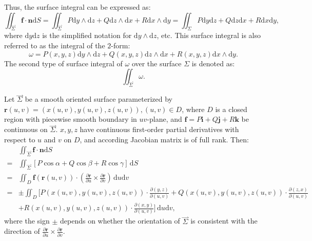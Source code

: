 \documentclass[11pt]{../../TexTemplate/elegantbook}
\begin{document}
Thus, the surface integral can be expressed as:
\[
\iint_{\overset{\rightharpoonup}{\Sigma}} \mathbf{f} \cdot \mathbf{n} \mathrm{d}S = 
\iint_{\overset{\rightharpoonup}{\Sigma}} P \mathrm{d}y \wedge \mathrm{d}z + Q \mathrm{d}z \wedge \mathrm{d}x + R \mathrm{d}x \wedge \mathrm{d}y
= \iint_{\Sigma} P \mathrm{d}y\mathrm{d}z + Q \mathrm{d}z\mathrm{d}x + R \mathrm{d}x\mathrm{d}y,
\]
where \(\mathrm{d}y\mathrm{d}z\) is the simplified notation for \(\mathrm{d}y \wedge \mathrm{d}z\), etc.
This surface integral is also referred to as the integral of the \(2\)-form:
\[
\omega = P(x, y, z) \mathrm{d}y \wedge \mathrm{d}z + Q(x, y, z) \mathrm{d}z \wedge \mathrm{d}x + R(x, y, z) \mathrm{d}x \wedge \mathrm{d}y.
\]
The second type of surface integral of \( \omega \) over the surface \( \Sigma \) is denoted as:
\[
\iint_{\overset{\rightharpoonup}{\Sigma}} \omega.
\]

\begin{theorem}
    Let \(\overset{\rightharpoonup}{\Sigma}\) be a smooth oriented surface parameterized by 
    \(\mathbf{r}(u, v) = (x(u, v), y(u, v), z(u, v)), (u, v) \in D\),
    where \(D\) is a closed region with piecewise smooth boundary in \(uv\)-plane,
    and \(\mathbf{f} = P\mathbf{i} + Q\mathbf{j} + R\mathbf{k}\) be continuous on \(\overset{\rightharpoonup}{\Sigma}\).
    \(x, y, z\) have continuous first-order partial derivatives with respect to \(u\) and \(v\) on \(D\),
    and according Jacobian matrix is of full rank.
    Then:
    \begin{align*}
        &\iint_{\overset{\rightharpoonup}{\Sigma}} \mathbf{f} \cdot \mathbf{n} \mathrm{d}S \\
        =&\iint_{\overset{\rightharpoonup}{\Sigma}} [P \cos\alpha + Q \cos\beta + R \cos\gamma] \, \mathrm{d}S \\
        =& \iint_{D} \mathbf{f}(\mathbf{r}(u, v)) \cdot \left( \frac{\partial \mathbf{r}}{\partial u} \times \frac{\partial \mathbf{r}}{\partial v} \right) \, \mathrm{d}u \mathrm{d}v \\
        =& \pm \iint_{D} \bigg[P(x(u, v), y(u, v), z(u, v)) \cdot \frac{\partial (y, z)}{\partial (u, v)} 
        + Q(x(u, v), y(u, v), z(u, v)) \cdot \frac{\partial (z, x)}{\partial (u, v)} \\
        &+ R(x(u, v), y(u, v), z(u, v)) \cdot \frac{\partial (x, y)}{\partial (u, v)}\bigg] \, \mathrm{d}u \mathrm{d}v,
    \end{align*}
    where the sign \(\pm\) depends on whether the orientation of \(\overset{\rightharpoonup}{\Sigma}\) is consistent with
    the direction of \(\frac{\partial \mathbf{r}}{\partial u} \times \frac{\partial \mathbf{r}}{\partial v}\).
\end{theorem}
\end{document}
